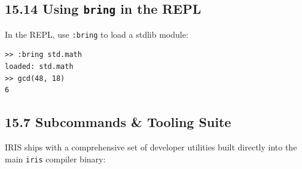\documentclass[
  english,
]{book}
\begin{document}
\subsection{\texorpdfstring{15.14 Using \texttt{bring} in the
REPL}{15.14 Using bring in the REPL}}\label{using-bring-in-the-repl}

In the REPL, use \texttt{:bring} to load a stdlib module:

\begin{verbatim}
>> :bring std.math
loaded: std.math
>> gcd(48, 18)
6
\end{verbatim}

\subsection{15.7 Subcommands \& Tooling
Suite}\label{subcommands-tooling-suite}

IRIS ships with a comprehensive set of developer utilities built
directly into the main \texttt{iris} compiler binary:
\end{document}
